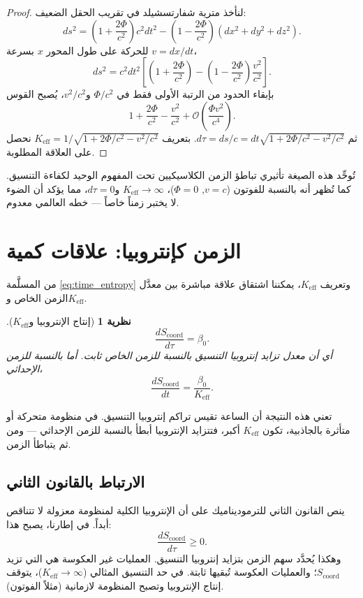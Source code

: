 \documentclass[11pt,a4paper]{article}
\newcommand{\Ke}{K_{\mathrm{eff}}}
\newcommand{\Scoord}{S_{\mathrm{coord}}}
\newtheorem{theorem}{نظرية}[section]
\begin{document}
	\begin{proof}
		لنأخذ مترية شفارتسشيلد في تقريب الحقل الضعيف:
		\[
		ds^2 = \left(1+\frac{2\Phi}{c^2}\right)c^2 dt^2 - \left(1-\frac{2\Phi}{c^2}\right)(dx^2+dy^2+dz^2).
		\]
		للحركة على طول المحور \(x\) بسرعة \(v = dx/dt\)،
		\[
		ds^2 = c^2 dt^2\left[ \left(1+\frac{2\Phi}{c^2}\right) - \left(1-\frac{2\Phi}{c^2}\right)\frac{v^2}{c^2} \right].
		\]
		بإبقاء الحدود من الرتبة الأولى فقط في \(\Phi/c^2\) و\(v^2/c^2\)، يُصبح القوس
		\[
		1 + \frac{2\Phi}{c^2} - \frac{v^2}{c^2} + \mathcal{O}\left(\frac{\Phi v^2}{c^4}\right).
		\]
		ثم \(d\tau = ds/c = dt\sqrt{1 + 2\Phi/c^2 - v^2/c^2}\). بتعريف \(\Ke = 1/\sqrt{1 + 2\Phi/c^2 - v^2/c^2}\) نحصل على العلاقة المطلوبة.
	\end{proof}
	
	تُوحِّد هذه الصيغة تأثيري تباطؤ الزمن الكلاسيكيين تحت المفهوم الوحيد لكفاءة التنسيق. كما تُظهر أنه بالنسبة للفوتون (\(v=c\), \(\Phi=0\))، \(\Ke \to \infty\) و\(d\tau = 0\)، مما يؤكد أن الضوء لا يختبر زمناً خاصاً — خطه العالمي معدوم.
	
	\section{الزمن كإنتروبيا: علاقات كمية}
	\label{sec:entropy}
	
	من المسلَّمة \ref{eq:time_entropy} وتعريف \(\Ke\)، يمكننا اشتقاق علاقة مباشرة بين معدَّل الزمن الخاص و\(\Ke\).
	
	\begin{theorem}[إنتاج الإنتروبيا و\(\Ke\)]
		\[
		\frac{d\Scoord}{d\tau} = \beta_0.
		\]
		أي أن معدل تزايد إنتروبيا التنسيق بالنسبة للزمن الخاص ثابت. أما بالنسبة للزمن الإحداثي،
		\[
		\frac{d\Scoord}{dt} = \frac{\beta_0}{\Ke}.
		\]
	\end{theorem}
	
	تعني هذه النتيجة أن الساعة تقيس تراكم إنتروبيا التنسيق. في منظومة متحركة أو متأثرة بالجاذبية، تكون \(\Ke\) أكبر، فتتزايد الإنتروبيا أبطأ بالنسبة للزمن الإحداثي — ومن ثم يتباطأ الزمن.
	
	\subsection{الارتباط بالقانون الثاني}
	
	ينص القانون الثاني للترموديناميك على أن الإنتروبيا الكلية لمنظومة معزولة لا تتناقص أبداً. في إطارنا، يصبح هذا:
	\begin{equation}
		\frac{d\Scoord}{d\tau} \ge 0.
	\end{equation}
	وهكذا يُحدَّد سهم الزمن بتزايد إنتروبيا التنسيق. العمليات غير العكوسة هي التي تزيد \(\Scoord\)؛ والعمليات العكوسة تُبقيها ثابتة. في حد التنسيق المثالي (\(\Ke \to \infty\))، يتوقف إنتاج الإنتروبيا وتصبح المنظومة لازمانية (مثلاً الفوتون).
	
\end{document}
